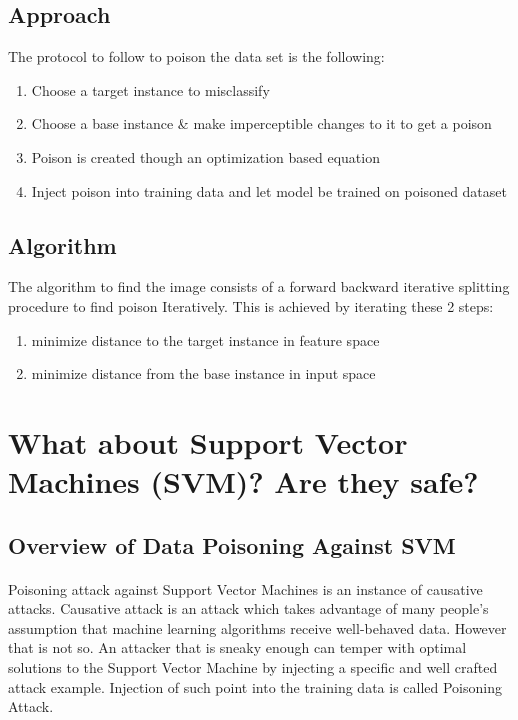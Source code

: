 \documentclass{article}
\begin{document}
\subsection{Approach}
The protocol to follow to poison the data set is the following:

\begin{enumerate}
  \item Choose a target instance to misclassify
  \item Choose a base instance \& make imperceptible changes to it to get a poison
  \item Poison is created though an optimization based equation
  \item Inject poison into training data and let model be trained on poisoned dataset
\end{enumerate}

\subsection{Algorithm}
The algorithm to find the image consists of a forward backward iterative splitting procedure to find poison Iteratively. This is achieved by iterating these 2 steps:



\begin{enumerate}
  \item minimize distance to the target instance in feature space
  \item minimize distance from the base instance  in input space
\end{enumerate}

\section{What about Support Vector Machines (SVM)? Are they safe?}
\subsection {Overview of Data Poisoning Against SVM}
\paragraph{}
Poisoning attack against Support Vector Machines is an instance of causative attacks. Causative attack is an attack which takes advantage of many people's assumption that machine learning algorithms receive well-behaved data. However that is not so. An attacker that is sneaky enough can temper with optimal solutions to the Support Vector Machine by injecting a specific and well crafted attack example. Injection of such point into the training data is called Poisoning Attack.
\end{document}
